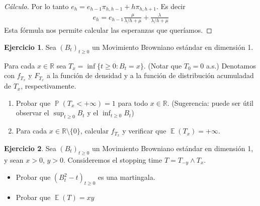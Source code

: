 \documentclass{article}
\DeclareMathOperator{\prob}{\mathbb{P}}
\DeclareMathOperator{\Expectation}{\mathbb{E}}
\newcommand{\realnum}{\mathbb{R}}
\theoremstyle{definition}
\newtheorem{exercise}{Ejercicio}
\begin{document}
\begin{proof}[Cálculo]
Por lo tanto \(e_h = e_{h - 1} \pi_{h, h - 1} + h \pi_{h, h + 1}\).
Es decir
\begin{align}
	e_h = e_{h - 1} \frac{\mu}{\lambda / h + \mu} + \frac{\lambda}{\lambda / h + \mu}
\end{align}
Esta fórmula nos permite calcular las esperanzas que queríamos.
\end{proof}
\endgroup

\newpage
\begin{exercise}
Sea $(B_t)_{t \geq 0}$ un Movimiento Browniano estándar en dimensión 1.

Para cada $x \in \realnum$ sea $T_x = \inf \{t \geq 0 : B_t = x\}$.
(Notar que \(T_0 = 0\) a.s.)
Denotamos con \(f_{T_x}\) y \(F_{T_x}\) a la función de densidad y a la función de distribución acumuladad de \(T_x\), respectivamente.
\begin{enumerate}[label=\alph*)]
	\item Probar que \(\prob(T_x < + \infty) = 1\) para todo \(x \in \realnum\).
	(Sugerencia: puede ser útil observar el \(\sup_{t \geq 0} B_t\) y el \(\inf_{t \geq 0} B_t\))
	\item Para cada \(x \in \realnum \setminus \{0\}\), calcular \(f_{T_x}\) y verificar que \(\Expectation(T_x) = + \infty\).
\end{enumerate}
\end{exercise}

\newpage
\begin{exercise}
Sea \((B_t)_{t \geq 0}\) un Movimiento Browniano estándar en dimensión 1, y sean \(x > 0\), \(y > 0\).
Consideremos el stopping time \(T = T_{- y} \wedge T_x\).
\begin{itemize}
	\item Probar que \((B_t^2 - t)_{t \geq 0}\) es una martingala.
	\item Probar que \(\Expectation(T) = xy\)
\end{itemize}
\end{exercise}
\end{document}
